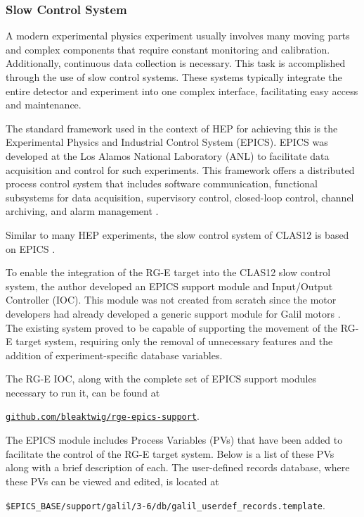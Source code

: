 \subsubsection{Slow Control System}
\label{sssec::slow_control_system}
    A modern experimental physics experiment usually involves many moving parts and complex components that require constant monitoring and calibration.
    Additionally, continuous data collection is necessary.
    This task is accomplished through the use of slow control systems.
    These systems typically integrate the entire detector and experiment into one complex interface, facilitating easy access and maintenance.

    The standard framework used in the context of HEP for achieving this is the Experimental Physics and Industrial Control System (EPICS).
    EPICS was developed at the Los Alamos National Laboratory (ANL) to facilitate data acquisition and control for such experiments.
    This framework offers a distributed process control system that includes software communication, functional subsystems for data acquisition, supervisory control, closed-loop control, channel archiving, and alarm management \cite{dalesio1991}.

    Similar to many HEP experiments, the slow control system of CLAS12 is based on EPICS \cite{boyarinov2020}.

    To enable the integration of the RG-E target into the CLAS12 slow control system, the author developed an EPICS support module and Input/Output Controller (IOC).
    This module was not created from scratch since the motor developers had already developed a generic support module for Galil motors \cite{farnswort2009}.
    The existing system proved to be capable of supporting the movement of the RG-E target system, requiring only the removal of unnecessary features and the addition of experiment-specific database variables.

    The RG-E IOC, along with the complete set of EPICS support modules necessary to run it, can be found at

    \begin{center}
        \hyperlink{github.com/bleaktwig/rge-epics-support}{\texttt{github.com/bleaktwig/rge-epics-support}}.
    \end{center}

    The EPICS module includes Process Variables (PVs) that have been added to facilitate the control of the RG-E target system.
    Below is a list of these PVs along with a brief description of each.
    The user-defined records database, where these PVs can be viewed and edited, is located at

    \begin{center}
        \texttt{\$EPICS\_BASE/support/galil/3-6/db/galil\_userdef\_records.template}.
    \end{center}

    
    
    
